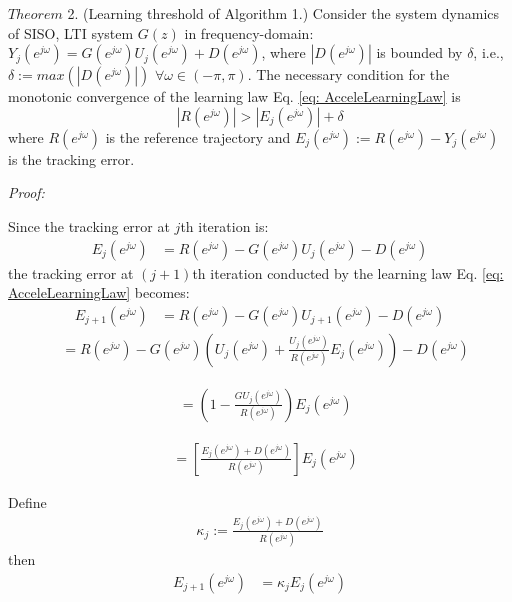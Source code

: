 \documentclass[a4paper, 12pt, twoside, openright]{mythesis}
\begin{document}
{$Theorem$ 2.} (Learning threshold of Algorithm 1.)
 Consider the system dynamics of SISO, LTI system $G(z)$ in frequency-domain: $Y_j(e^{j\omega})=G(e^{j\omega})U_j(e^{j\omega})+D(e^{j\omega})$, where  $|D(e^{j\omega})|$ is bounded by $\delta$, i.e., $\delta:=max(|D(e^{j\omega})|)$ $\forall \omega\in(-\pi,\pi)$. The necessary condition for the monotonic convergence of the learning law Eq. \ref{eq: AcceleLearningLaw} is 
\begin{equation}
 |R(e^{j\omega})|>|E_j(e^{j\omega})|+\delta
 \label{eq: MonoCond}
 \end{equation}
where $R(e^{j\omega})$ is the reference trajectory and $E_j(e^{j\omega}):=R(e^{j\omega})-Y_j(e^{j\omega})$ is the tracking error. 


\textit{Proof:}

Since the tracking error at $j$th iteration is:
\begin{align}
E_j(e^{j\omega})&=R(e^{j\omega})-G(e^{j\omega})U_j(e^{j\omega})-D(e^{j\omega})
\end{align}
the tracking error at $(j+1)$th iteration conducted by the learning law Eq. \ref{eq: AcceleLearningLaw}
becomes:
\begin{align}
E_{j+1}(e^{j\omega})&=R(e^{j\omega})-G(e^{j\omega})U_{j+1}(e^{j\omega})-D(e^{j\omega})
\end{align}
\begin{align}
&=R(e^{j\omega})-G(e^{j\omega})(U_j(e^{j\omega})+\frac{U_j(e^{j\omega})}{R(e^{j\omega})}E_{j}(e^{j\omega}))-D(e^{j\omega})
\end{align}

\begin{align}
&=(1-\frac{GU_j(e^{j\omega})}{R(e^{j\omega})})E_{j}(e^{j\omega})
\end{align}

\begin{align}
&=[\frac{E_j(e^{j\omega})+D(e^{j\omega})}{R(e^{j\omega})}]E_{j}(e^{j\omega})
\end{align}

Define 
\begin{align}
\kappa_j:=\frac{E_j(e^{j\omega})+D(e^{j\omega})}{R(e^{j\omega})}
\end{align}
then
\begin{align}
E_{j+1}(e^{j\omega})&=\kappa_jE_{j}(e^{j\omega})
\end{align}
\end{document}
